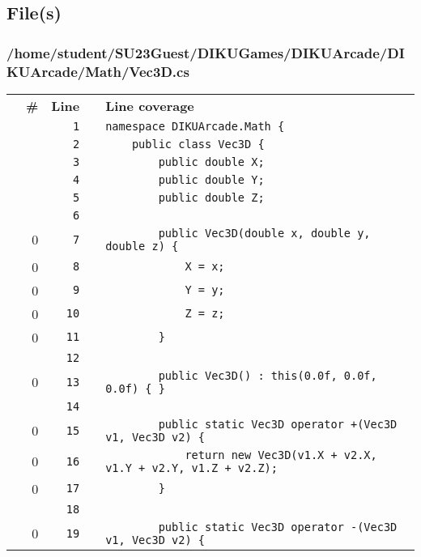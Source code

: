 \documentclass[a4paper,landscape,10pt]{article}
\begin{document}
\subsection{File(s)}
\subsubsection{/home/student/SU23Guest/DIKUGames/DIKUArcade/DIKUArcade/Math/Vec3D.cs}
\begin{longtable}[l]{lrrll}
\textbf{} & \textbf{\#} & \textbf{Line} & \textbf{} & \textbf{Line coverage}\\
\cellcolor{gray} &  & \verb~1~ & & \verb~namespace DIKUArcade.Math {~\\
\cellcolor{gray} &  & \verb~2~ & & \verb~    public class Vec3D {~\\
\cellcolor{gray} &  & \verb~3~ & & \verb~        public double X;~\\
\cellcolor{gray} &  & \verb~4~ & & \verb~        public double Y;~\\
\cellcolor{gray} &  & \verb~5~ & & \verb~        public double Z;~\\
\cellcolor{gray} &  & \verb~6~ & & \verb~~\\
\cellcolor{red} & 0 & \verb~7~ & & \verb~        public Vec3D(double x, double y, double z) {~\\
\cellcolor{red} & 0 & \verb~8~ & & \verb~            X = x;~\\
\cellcolor{red} & 0 & \verb~9~ & & \verb~            Y = y;~\\
\cellcolor{red} & 0 & \verb~10~ & & \verb~            Z = z;~\\
\cellcolor{red} & 0 & \verb~11~ & & \verb~        }~\\
\cellcolor{gray} &  & \verb~12~ & & \verb~~\\
\cellcolor{red} & 0 & \verb~13~ & & \verb~        public Vec3D() : this(0.0f, 0.0f, 0.0f) { }~\\
\cellcolor{gray} &  & \verb~14~ & & \verb~~\\
\cellcolor{red} & 0 & \verb~15~ & & \verb~        public static Vec3D operator +(Vec3D v1, Vec3D v2) {~\\
\cellcolor{red} & 0 & \verb~16~ & & \verb~            return new Vec3D(v1.X + v2.X, v1.Y + v2.Y, v1.Z + v2.Z);~\\
\cellcolor{red} & 0 & \verb~17~ & & \verb~        }~\\
\cellcolor{gray} &  & \verb~18~ & & \verb~~\\
\cellcolor{red} & 0 & \verb~19~ & & \verb~        public static Vec3D operator -(Vec3D v1, Vec3D v2) {~\\

\end{longtable}
\end{document}
